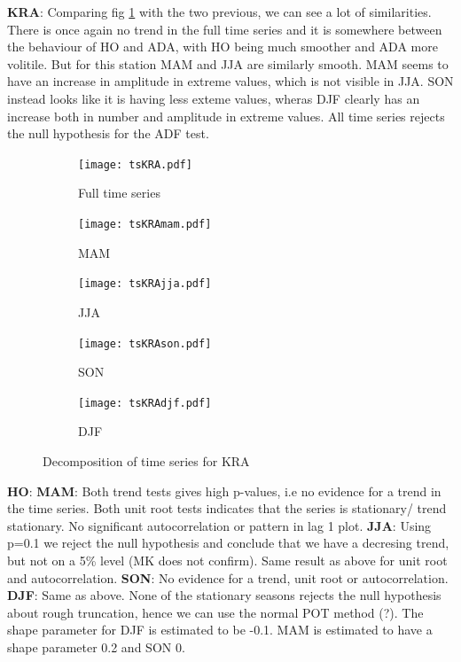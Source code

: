 \documentclass{article}
\begin{document}
	{\Large\textbf{KRA}}: Comparing fig \ref{tsKRA} with the two previous, we can see a lot of similarities. There is once again no trend in the full time series and it is somewhere between the behaviour of HO and ADA, with HO being much smoother and ADA more volitile. But for this station MAM and JJA are similarly smooth. MAM seems to have an increase in amplitude in extreme values, which is not visible in JJA. SON instead looks like it is having less exteme values, wheras DJF clearly has an increase both in number and amplitude in extreme values. All time series rejects the null hypothesis for the ADF test.
	\begin{figure}[H]
		\centering
		\begin{subfigure}{0.6\textwidth}
			\centering
			\texttt{[image: tsKRA.pdf]}
			\caption{Full time series}
		\end{subfigure}
		\begin{subfigure}{0.5\textwidth}
			\centering
			\texttt{[image: tsKRAmam.pdf]}
			\caption{MAM}
		\end{subfigure}%
		\begin{subfigure}{0.5\textwidth}
			\centering
			\texttt{[image: tsKRAjja.pdf]}
			\caption{JJA}
		\end{subfigure}
		\begin{subfigure}{0.5\textwidth}
			\centering
			\texttt{[image: tsKRAson.pdf]}
			\caption{SON}
		\end{subfigure}%
		\begin{subfigure}{0.5\textwidth}
			\centering
			\texttt{[image: tsKRAdjf.pdf]}
			\caption{DJF}
		\end{subfigure}%
		\caption{Decomposition of time series for KRA}
		\label{tsKRA}
	\end{figure}
	

	{\Large\textbf{HO}}: \textbf{MAM}: Both trend tests gives high p-values, i.e no evidence for a trend in the time series. Both unit root tests indicates that the series is stationary/ trend stationary. No significant autocorrelation or pattern in lag 1 plot.
	\textbf{JJA}: Using p=0.1 we reject the null hypothesis and conclude that we have a decresing trend, but not on a 5\% level (MK does not confirm). Same result as above for unit root and autocorrelation.
	\textbf{SON}: No evidence for a trend, unit root or autocorrelation. 
	\textbf{DJF}: Same as above.
	None of the stationary seasons rejects the null hypothesis about rough truncation, hence we can use the normal POT method (?). The shape parameter for DJF is estimated to be -0.1. MAM is estimated to have a shape parameter 0.2 and SON 0.\\
	
\end{document}
